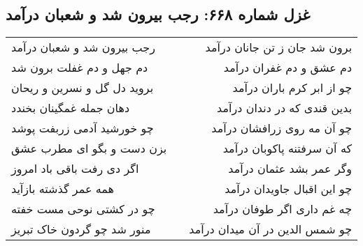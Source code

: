 \begin{center}
\section*{غزل شماره ۶۶۸: رجب بیرون شد و شعبان درآمد}
\label{sec:0668}
\begin{longtable}{l p{0.5cm} r}
رجب بیرون شد و شعبان درآمد
&&
برون شد جان ز تن جانان درآمد
\\
دم جهل و دم غفلت برون شد
&&
دم عشق و دم غفران درآمد
\\
بروید دل گل و نسرین و ریحان
&&
چو از ابر کرم باران درآمد
\\
دهان جمله غمگینان بخندد
&&
بدین قندی که در دندان درآمد
\\
چو خورشید آدمی زربفت پوشد
&&
چو آن مه روی زرافشان درآمد
\\
بزن دست و بگو ای مطرب عشق
&&
که آن سرفتنه پاکوبان درآمد
\\
اگر دی رفت باقی باد امروز
&&
وگر عمر بشد عثمان درآمد
\\
همه عمر گذشته بازآید
&&
چو این اقبال جاویدان درآمد
\\
چو در کشتی نوحی مست خفته
&&
چه غم داری اگر طوفان درآمد
\\
منور شد چو گردون خاک تبریز
&&
چو شمس الدین در آن میدان درآمد
\\
\end{longtable}
\end{center}
